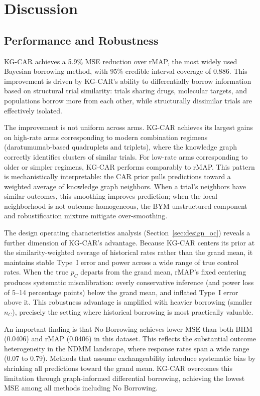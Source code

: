 \documentclass[12pt]{article}
\begin{document}
\section{Discussion}
\label{sec:discussion}

\subsection{Performance and Robustness}
\label{sec:disc_performance}

KG-CAR achieves a 5.9\% MSE reduction over rMAP, the most widely used Bayesian borrowing method, with 95\% credible interval coverage of 0.886. This improvement is driven by KG-CAR's ability to differentially borrow information based on structural trial similarity: trials sharing drugs, molecular targets, and populations borrow more from each other, while structurally dissimilar trials are effectively isolated.

The improvement is not uniform across arms. KG-CAR achieves its largest gains on high-rate arms corresponding to modern combination regimens (daratumumab-based quadruplets and triplets), where the knowledge graph correctly identifies clusters of similar trials. For low-rate arms corresponding to older or simpler regimens, KG-CAR performs comparably to rMAP. This pattern is mechanistically interpretable: the CAR prior pulls predictions toward a weighted average of knowledge graph neighbors. When a trial's neighbors have similar outcomes, this smoothing improves prediction; when the local neighborhood is not outcome-homogeneous, the BYM unstructured component and robustification mixture mitigate over-smoothing.

The design operating characteristics analysis (Section~\ref{sec:design_oc}) reveals a further dimension of KG-CAR's advantage. Because KG-CAR centers its prior at the similarity-weighted average of historical rates rather than the grand mean, it maintains stable Type~I error and power across a wide range of true control rates. When the true $p_C$ departs from the grand mean, rMAP's fixed centering produces systematic miscalibration: overly conservative inference (and power loss of 5--14 percentage points) below the grand mean, and inflated Type~I error above it. This robustness advantage is amplified with heavier borrowing (smaller $n_C$), precisely the setting where historical borrowing is most practically valuable.

An important finding is that No Borrowing achieves lower MSE than both BHM (0.0406) and rMAP (0.0406) in this dataset. This reflects the substantial outcome heterogeneity in the NDMM landscape, where response rates span a wide range (0.07 to 0.79). Methods that assume exchangeability introduce systematic bias by shrinking all predictions toward the grand mean. KG-CAR overcomes this limitation through graph-informed differential borrowing, achieving the lowest MSE among all methods including No Borrowing.
\end{document}

